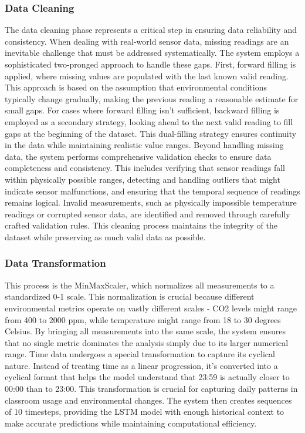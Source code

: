 \subsubsection{Data Cleaning}
The data cleaning phase represents a critical step in ensuring data reliability and consistency. When dealing with real-world sensor data, missing readings are an inevitable challenge that must be addressed systematically. The system employs a sophisticated two-pronged approach to handle these gaps. First, forward filling is applied, where missing values are populated with the last known valid reading. This approach is based on the assumption that environmental conditions typically change gradually, making the previous reading a reasonable estimate for small gaps. For cases where forward filling isn't sufficient, backward filling is employed as a secondary strategy, looking ahead to the next valid reading to fill gaps at the beginning of the dataset. This dual-filling strategy ensures continuity in the data while maintaining realistic value ranges. Beyond handling missing data, the system performs comprehensive validation checks to ensure data completeness and consistency. This includes verifying that sensor readings fall within physically possible ranges, detecting and handling outliers that might indicate sensor malfunctions, and ensuring that the temporal sequence of readings remains logical. Invalid measurements, such as physically impossible temperature readings or corrupted sensor data, are identified and removed through carefully crafted validation rules. This cleaning process maintains the integrity of the dataset while preserving as much valid data as possible.
\\

\subsubsection{Data Transformation}
This process is the MinMaxScaler, which normalizes all measurements to a standardized 0-1 scale. This normalization is crucial because different environmental metrics operate on vastly different scales - CO2 levels might range from 400 to 2000 ppm, while temperature might range from 18 to 30 degrees Celsius. By bringing all measurements into the same scale, the system ensures that no single metric dominates the analysis simply due to its larger numerical range. Time data undergoes a special transformation to capture its cyclical nature. Instead of treating time as a linear progression, it's converted into a cyclical format that helps the model understand that 23:59 is actually closer to 00:00 than to 23:00. This transformation is crucial for capturing daily patterns in classroom usage and environmental changes. The system then creates sequences of 10 timesteps, providing the LSTM model with enough historical context to make accurate predictions while maintaining computational efficiency.
